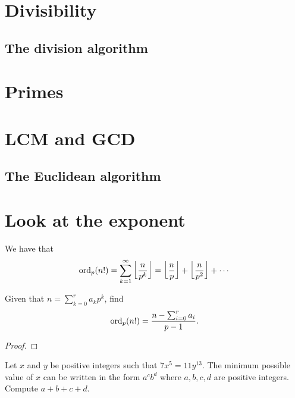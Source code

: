 \section{Divisibility}

\subsection{The division algorithm}

\section{Primes}

\section{LCM and GCD}

\subsection{The Euclidean algorithm}

\section{Look at the exponent}
\begin{thm}\label{factorial-order}
We have that 
\[
\operatorname{ord}_p(n!)=\sum_{k=1}^{\infty}\left\lfloor\frac{n}{p^k}\right\rfloor=\left\lfloor\frac{n}{p}\right\rfloor+\left\lfloor\frac{n}{p^2}\right\rfloor+\cdots 
\]

Given that $n=\sum_{k=0}^r a_kp^k$, find 
\[
\operatorname{ord}_p(n!)=\frac{n-\sum_{i=0}^r a_i}{p-1}.
\]
\end{thm}
\begin{proof}


\end{proof}
\begin{ex}[AMC ??]
Let $x$ and $y$ be positive integers such that $7x^5=11y^{13}$. The minimum possible value of $x$ can be written in the form $a^cb^d$ where $a,b,c,d$ are positive integers. Compute $a+b+c+d$.
\end{ex}